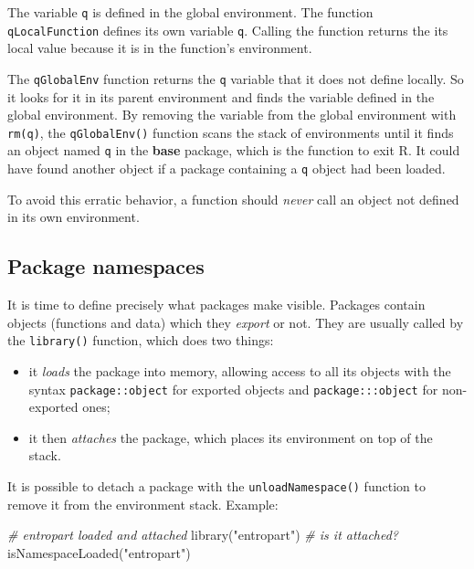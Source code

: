 \documentclass[
  12pt,
  american,
  a4paper,
  extrafontsizes,onecolumn,openright
  ]{memoir}
\newenvironment{Shaded}{\begin{snugshade}}{\end{snugshade}}
\newcommand{\CommentTok}[1]{\textcolor[rgb]{0.56,0.35,0.01}{\textit{#1}}}
\newcommand{\FunctionTok}[1]{\textcolor[rgb]{0.00,0.00,0.00}{#1}}
\newcommand{\NormalTok}[1]{#1}
\newcommand{\StringTok}[1]{\textcolor[rgb]{0.31,0.60,0.02}{#1}}
\providecommand{\tightlist}{%
  \setlength{\itemsep}{0pt}\setlength{\parskip}{0pt}}
\begin{document}
The variable \texttt{q} is defined in the global environment.
The function \texttt{qLocalFunction} defines its own variable \texttt{q}.
Calling the function returns the its local value because it is in the function's environment.

The \texttt{qGlobalEnv} function returns the \texttt{q} variable that it does not define locally.
So it looks for it in its parent environment and finds the variable defined in the global environment.
By removing the variable from the global environment with \texttt{rm(q)}, the \texttt{qGlobalEnv()} function scans the stack of environments until it finds an object named \texttt{q} in the \textbf{base} package, which is the function to exit R.
It could have found another object if a package containing a \texttt{q} object had been loaded.

To avoid this erratic behavior, a function should \emph{never} call an object not defined in its own environment.

\hypertarget{package-namespaces}{%
\subsection{Package namespaces}\label{package-namespaces}}

It is time to define precisely what packages make visible.
Packages contain objects (functions and data) which they \emph{export} or not.
They are usually called by the \texttt{library()} function, which does two things:

\begin{itemize}
\tightlist
\item
  it \emph{loads} the package into memory, allowing access to all its objects with the syntax \texttt{package::object} for exported objects and \texttt{package:::object} for non-exported ones;
\item
  it then \emph{attaches} the package, which places its environment on top of the stack.
\end{itemize}

It is possible to detach a package with the \texttt{unloadNamespace()} function to remove it from the environment stack.
Example:

\scriptsize

\begin{Shaded}
\begin{Highlighting}[]
\CommentTok{\# entropart loaded and attached}
\FunctionTok{library}\NormalTok{(}\StringTok{"entropart"}\NormalTok{)}
\CommentTok{\# is it attached?}
\FunctionTok{isNamespaceLoaded}\NormalTok{(}\StringTok{"entropart"}\NormalTok{)}
\end{Highlighting}
\end{Shaded}
\end{document}
